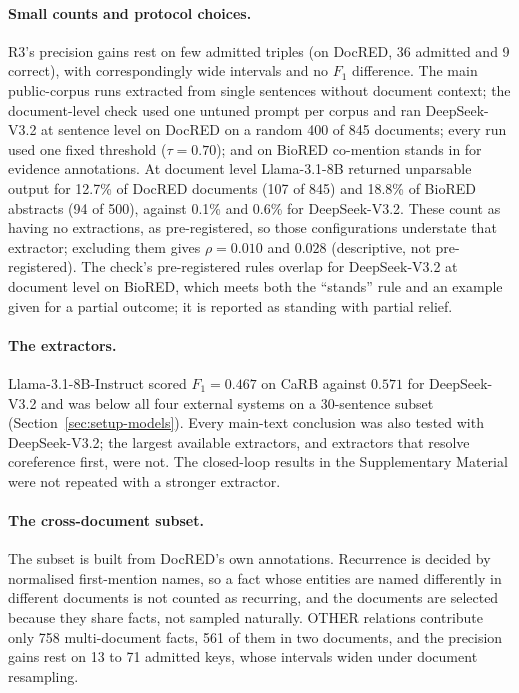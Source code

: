 \documentclass[preprint,12pt,authoryear]{elsarticle}
\begin{document}
\paragraph{Small counts and protocol choices.} R3's precision gains rest
on few admitted triples (on DocRED, 36 admitted and 9 correct), with
correspondingly wide intervals and no $F_1$ difference. The main
public-corpus runs extracted from single sentences without document
context; the document-level check used one untuned prompt per corpus and
ran DeepSeek-V3.2 at sentence level on DocRED on a random 400 of 845
documents; every run used one fixed threshold ($\tau=0.70$); and on
BioRED co-mention stands in for evidence annotations. At document level
Llama-3.1-8B returned unparsable output for 12.7\% of DocRED documents
(107 of 845) and 18.8\% of BioRED abstracts (94 of 500), against 0.1\%
and 0.6\% for DeepSeek-V3.2. These count as having no extractions, as
pre-registered, so those configurations understate that extractor;
excluding them gives $\rho = 0.010$ and $0.028$ (descriptive, not
pre-registered). The check's pre-registered rules overlap for
DeepSeek-V3.2 at document level on BioRED, which meets both the
``stands'' rule and an example given for a partial outcome; it is
reported as standing with partial relief.

\paragraph{The extractors.} Llama-3.1-8B-Instruct scored $F_1=0.467$ on
CaRB against $0.571$ for DeepSeek-V3.2 and was below all four external
systems on a 30-sentence subset (Section~\ref{sec:setup-models}). Every
main-text conclusion was also tested with DeepSeek-V3.2; the largest
available extractors, and extractors that resolve coreference first, were
not. The closed-loop results in the Supplementary Material were not
repeated with a stronger extractor.

\paragraph{The cross-document subset.} The subset is built from DocRED's
own annotations. Recurrence is decided by normalised first-mention
names, so a fact whose entities are named differently in different
documents is not counted as recurring, and the documents are selected
because they share facts, not sampled naturally. OTHER relations
contribute only 758 multi-document facts, 561 of them in two documents,
and the precision gains rest on 13 to 71 admitted keys, whose intervals
widen under document resampling.
\end{document}
